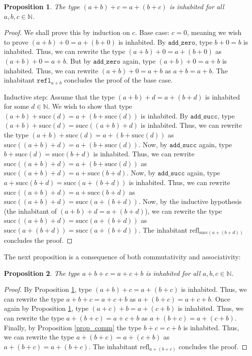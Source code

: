 \documentclass[12pt]{article}
\newtheorem{proposition}{Proposition}[section]
\theoremstyle{definition}
\theoremstyle{remark}
\begin{document}
\begin{proposition}\label{prop_assoc}
  The type $(a+b)+c = a+(b+c)$ is inhabited for all $a, b, c \in \mathbb{N}$.
\end{proposition}
\begin{proof}
  We shall prove this by induction on $c$. Base case: $c = 0$, meaning we wish to prove $(a+b)+0 = a+(b+0)$ is inhabited. By $\texttt{add\_zero}$, type $b+0=b$ is inhabited. Thus, we can rewrite the type $(a+b)+0 = a+(b+0)$ as $(a+b)+0 = a+b$. But by $\texttt{add\_zero}$ again, type $(a+b)+0 = a+b$ is inhabited. Thus, we can rewrite $(a+b)+0 = a+b$ as $a+b = a+b$. The inhabitant $\texttt{refl}_{a+b}$ concludes the proof of the base case. 
  
  Inductive step: Assume that the type $(a+b)+d = a+(b+d)$ is inhabited for some $d \in \mathbb{N}$. We wish to show that type $(a+b)+\text{succ}(d) = a+(b+\text{succ}(d))$ is inhabited. By $\texttt{add\_succ}$, type $(a+b)+\text{succ}(d) = \text{succ}((a+b)+d)$ is inhabited. Thus, we can rewrite the type $(a+b)+\text{succ}(d) = a+(b+\text{succ}(d))$ as $\text{succ}((a+b)+d) = a+(b+\text{succ}(d))$. Now, by $\texttt{add\_succ}$ again, type $b+\text{succ}(d) = \text{succ}(b+d)$ is inhabited. Thus, we can rewrite $\text{succ}((a+b)+d) = a+(b+\text{succ}(d))$ as $\text{succ}((a+b)+d) = a+\text{succ}(b+d)$. Now, by $\texttt{add\_succ}$ again, type $a+\text{succ}(b+d) = \text{succ}(a+(b+d))$ is inhabited. Thus, we can rewrite $\text{succ}((a+b)+d) = a+\text{succ}(b+d)$ as $\text{succ}((a+b)+d) = \text{succ}(a+(b+d))$. Now, by the inductive hypothesis (the inhabitant of $(a+b)+d = a+(b+d)$), we can rewrite the type $\text{succ}((a+b)+d) = \text{succ}(a+(b+d))$ as $\text{succ}(a+(b+d)) = \text{succ}(a+(b+d))$. The inhabitant $\text{refl}_{\text{succ}(a+(b+d))}$ concludes the proof. 
\end{proof}

The next proposition is a consequence of both commutativity and associativity:

\begin{proposition}
  The type $a + b + c = a + c + b$ is inhabited for all $a,b,c \in \mathbb{N}$.
\end{proposition}
\begin{proof}
By Proposition \ref{prop_assoc}, type $(a+b)+c = a+(b+c)$ is inhabited. Thus, we can rewrite the type $a+b+c = a+c+b$ as $a+(b+c) = a+c+b$. Once again by Proposition \ref{prop_assoc}, type $(a+c)+b = a+(c+b)$ is inhabited. Thus, we can rewrite the type $a+(b+c) = a+c+b$ as $a+(b+c) = a+(c+b)$. Finally, by Proposition \ref{prop_comm} the type $b + c = c+b$ is inhabited. Thus, we can rewrite the type $a+(b+c) = a+(c+b)$ as $a+(b+c) = a+(b+c)$. The inhabitant $\text{refl}_{a+(b+c)}$ concludes the proof.
\end{proof}
\end{document}
